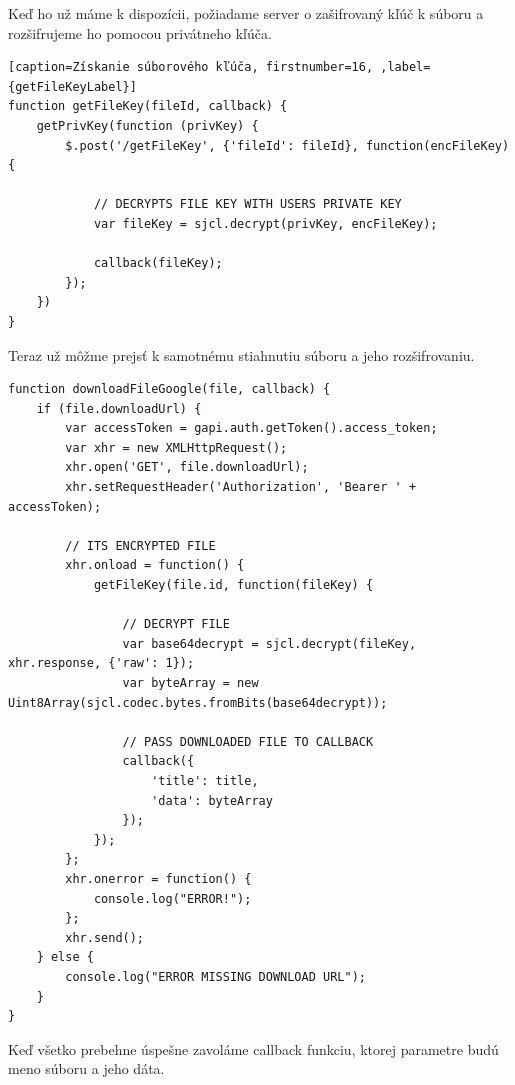 		Keď ho už máme k dispozícii, požiadame server o zašifrovaný kľúč k súboru a rozšifrujeme ho pomocou privátneho kľúča.

\begin{lstlisting}[caption=Získanie súborového kľúča, firstnumber=16, ,label={getFileKeyLabel}]	
function getFileKey(fileId, callback) {
    getPrivKey(function (privKey) {
        $.post('/getFileKey', {'fileId': fileId}, function(encFileKey) {

            // DECRYPTS FILE KEY WITH USERS PRIVATE KEY
            var fileKey = sjcl.decrypt(privKey, encFileKey);

            callback(fileKey);
        });
    })
}
\end{lstlisting}

		Teraz už môžme prejsť k samotnému stiahnutiu súboru a jeho rozšifrovaniu. 
		
\begin{lstlisting}[caption=Stiahnutie súboru, firstnumber=27]	
function downloadFileGoogle(file, callback) {
    if (file.downloadUrl) {
        var accessToken = gapi.auth.getToken().access_token;
        var xhr = new XMLHttpRequest();
        xhr.open('GET', file.downloadUrl);
        xhr.setRequestHeader('Authorization', 'Bearer ' + accessToken);
        
        // ITS ENCRYPTED FILE
        xhr.onload = function() {
            getFileKey(file.id, function(fileKey) {

                // DECRYPT FILE
                var base64decrypt = sjcl.decrypt(fileKey, xhr.response, {'raw': 1});
                var byteArray = new Uint8Array(sjcl.codec.bytes.fromBits(base64decrypt));

                // PASS DOWNLOADED FILE TO CALLBACK
                callback({
                    'title': title,
                    'data': byteArray
                });
            });
        };
        xhr.onerror = function() {
            console.log("ERROR!");
        };
        xhr.send();
    } else {
        console.log("ERROR MISSING DOWNLOAD URL");
    }
}
\end{lstlisting}

		Keď všetko prebehne úspešne zavoláme callback funkciu, ktorej parametre budú meno súboru a jeho dáta. 
		
